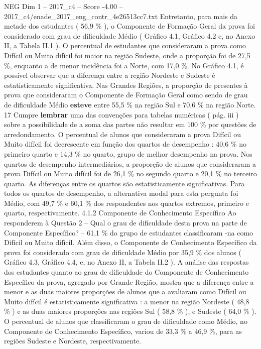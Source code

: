 \begin{textsample}{NEG Dim 1 – 2017\_c4 – Score -4.00 – 2017\_c4/enade\_2017\_eng\_contr\_4e26513cc7.txt}
Entretanto, para mais da metade dos estudantes ( 56,9 \% ), o Componente de Formação Geral da prova foi considerado com grau de dificuldade Médio ( Gráfico 4.1, Gráfico 4.2 e, no Anexo II, a Tabela II.1 ).
O percentual de estudantes que consideraram a prova como Difícil ou Muito difícil foi maior na região Sudeste, onde a proporção foi de 27,5 \%, enquanto a de menor incidência foi a Norte, com 17,0 \%.
No Gráfico 4.1, é possível observar que a diferença entre a região Nordeste e Sudeste é estatisticamente significativa.
Nas Grandes Regiões, a proporção de presentes à prova que consideraram o Componente de Formação Geral como sendo de grau de dificuldade Médio \textbf{esteve} entre 55,5 \% na região Sul e 70,6 \% na região Norte. 17 Cumpre \textbf{lembrar} uma das convenções para tabelas numéricas ( pág. iii ) sobre a possibilidade de a soma das partes não resultar em 100 \% por questões de arredondamento.
O percentual de alunos que consideraram a prova Difícil ou Muito difícil foi decrescente em função dos quartos de desempenho : 40,6 \% no primeiro quarto e 14,3 \% no quarto, grupo de melhor desempenho na prova.
Nos quartos de desempenho intermediários, a proporção de alunos que consideraram a prova Difícil ou Muito difícil foi de 26,1 \% no segundo quarto e 20,1 \% no terceiro quarto.
As diferenças entre os quartos são estatisticamente significativas.
Para todos os quartos de desempenho, a alternativa modal para esta pergunta foi Médio, com 49,7 \% e 60,1 \% dos respondentes nos quartos extremos, primeiro e quarto, respectivamente. 4.1.2 Componente de Conhecimento Específico Ao responderem à Questão 2 – Qual o grau de dificuldade desta prova na parte de Componente Específico? – 61,1 \% do grupo de estudantes classificaram -na como Difícil ou Muito difícil.
Além disso, o Componente de Conhecimento Específico da prova foi considerado com grau de dificuldade Médio por 35,9 \% dos alunos ( Gráfico 4.3, Gráfico 4.4, e, no Anexo II, a Tabela II.2 ).
A análise das respostas dos estudantes quanto ao grau de dificuldade do Componente de Conhecimento Específico da prova, agregado por Grande Região, mostra que a diferença entre a menor e as duas maiores proporções de alunos que a avaliaram como Difícil ou Muito difícil é estatisticamente significativa : a menor na região Nordeste ( 48,8 \% ) e as duas maiores proporções nas regiões Sul ( 58,8 \% ), e Sudeste ( 64,0 \% ).
O percentual de alunos que classificaram o grau de dificuldade como Médio, no Componente de Conhecimento Específico, variou de 33,3 \% a 46,9 \%, para as regiões Sudeste e Nordeste, respectivamente.

\end{textsample}
